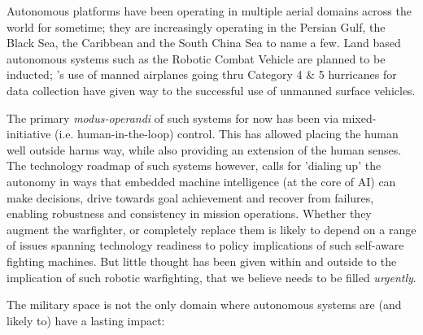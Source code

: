 \documentclass[11pt,letterpaper]{article}
\begin{document}
Autonomous platforms have been operating in multiple aerial domains
across the world for sometime; they are increasingly operating in the
Persian Gulf, the Black Sea, the Caribbean and the South China Sea to
name a few. Land based autonomous systems such as the Robotic Combat
Vehicle are planned to be inducted; \noae's use of manned airplanes
going thru Category 4 \& 5 hurricanes for data collection have given
way to the successful use of unmanned surface vehicles.

The primary \emph{modus-operandi} of such systems for now has been via
mixed-initiative (i.e. human-in-the-loop) control. This has allowed
placing the human well outside harms way, while also providing an
extension of the human senses. The technology roadmap of such systems
however, calls for 'dialing up' the autonomy in ways that embedded
machine intelligence (at the core of AI) can make decisions, drive
towards goal achievement and recover from failures, enabling
robustness and consistency in mission operations. Whether they augment
the warfighter, or completely replace them is likely to depend on a
range of issues spanning technology readiness to policy implications
of such self-aware fighting machines. But little thought has been
given within and outside \org to the implication of such robotic
warfighting, that we believe needs to be filled \emph{urgently}.

\pagebreak

The military space is not the only domain where autonomous systems are
(and likely to) have a lasting impact:
\end{document}
